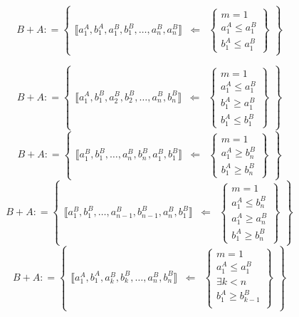 \begin{enumerate}
  \[{{B + A}{: =}}\begin{Bmatrix}
  {⟦{{a_{1}^{A},b_{1}^{A}},{a_{1}^{B},b_{1}^{B}},\ldots,{a_{n}^{B},a_{n}^{B}}}⟧} & \Leftarrow & \begin{Bmatrix}
  {m = 1} \\
  {a_{1}^{A} \leq a_{1}^{B}} \\
  {b_{1}^{A} \leq a_{1}^{B}}
  \end{Bmatrix}
  \end{Bmatrix}\]

  \[{{B + A}{: =}}\begin{Bmatrix}
  {⟦{{a_{1}^{A},b_{1}^{B}},{a_{2}^{B},b_{2}^{B}},\ldots,{a_{n}^{B},b_{n}^{B}}}⟧} & \Leftarrow & \begin{Bmatrix}
  {m = 1} \\
  {a_{1}^{A} \leq a_{1}^{B}} \\
  {b_{1}^{A} \geq a_{1}^{B}} \\
  {b_{1}^{A} \leq b_{1}^{B}}
  \end{Bmatrix}
  \end{Bmatrix}\] \[{{B + A}{: =}}\begin{Bmatrix}
  {⟦{{a_{1}^{B},b_{1}^{B}},\ldots,{a_{n}^{B},b_{n}^{B}},{a_{1}^{B},b_{1}^{B}}}⟧} & \Leftarrow & \begin{Bmatrix}
  {m = 1} \\
  {a_{1}^{A} \geq b_{n}^{B}} \\
  {b_{1}^{A} \geq b_{n}^{B}}
  \end{Bmatrix}
  \end{Bmatrix}\]\[{{B + A}{: =}}\begin{Bmatrix}
  {⟦{{a_{1}^{B},b_{1}^{B}},\ldots,{a_{n - 1}^{B},b_{n - 1}^{B}},{a_{n}^{B},b_{1}^{B}}}⟧} & \Leftarrow & \begin{Bmatrix}
  {m = 1} \\
  {a_{1}^{A} \leq b_{n}^{B}} \\
  {a_{1}^{A} \geq a_{n}^{B}} \\
  {b_{1}^{A} \geq b_{n}^{B}}
  \end{Bmatrix}
  \end{Bmatrix}\]\[{{B + A}{: =}}\begin{Bmatrix}
  {⟦{{a_{1}^{A},b_{1}^{A}},{a_{k}^{B},b_{k}^{B}},\ldots,{a_{n}^{B},b_{n}^{B}}}⟧} & \Leftarrow & \begin{Bmatrix}
  {m = 1} \\
  {a_{1}^{A} \leq a_{1}^{B}} \\
  {\exists{k < n}} \\
  {b_{1}^{A} \geq b_{k - 1}^{B}} \\

\end{Bmatrix}
\end{Bmatrix}\]
\end{enumerate}
